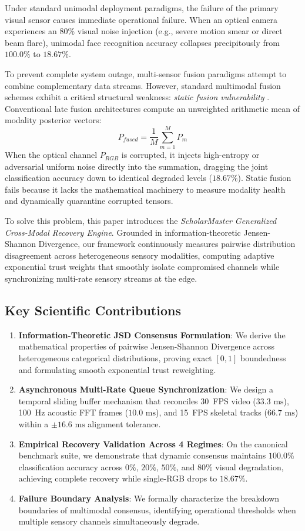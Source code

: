 \documentclass[10pt,journal,compsoc]{IEEEtran}
\begin{document}
Under standard unimodal deployment paradigms, the failure of the primary visual sensor causes immediate operational failure. When an optical camera experiences an $80\%$ visual noise injection (e.g., severe motion smear or direct beam flare), unimodal face recognition accuracy collapses precipitously from $100.0\%$ to $18.67\%$. 

To prevent complete system outage, multi-sensor fusion paradigms attempt to combine complementary data streams. However, standard multimodal fusion schemes exhibit a critical structural weakness: \textit{static fusion vulnerability} \cite{ngiam2011multimodal}. Conventional late fusion architectures compute an unweighted arithmetic mean of modality posterior vectors:
\begin{equation}
P_{fused} = \frac{1}{M} \sum_{m=1}^M P_m
\end{equation}
When the optical channel $P_{RGB}$ is corrupted, it injects high-entropy or adversarial uniform noise directly into the summation, dragging the joint classification accuracy down to identical degraded levels ($18.67\%$). Static fusion fails because it lacks the mathematical machinery to measure modality health and dynamically quarantine corrupted tensors.

To solve this problem, this paper introduces the \textit{ScholarMaster Generalized Cross-Modal Recovery Engine}. Grounded in information-theoretic Jensen-Shannon Divergence, our framework continuously measures pairwise distribution disagreement across heterogeneous sensory modalities, computing adaptive exponential trust weights that smoothly isolate compromised channels while synchronizing multi-rate sensory streams at the edge.

\subsection{Key Scientific Contributions}
\begin{enumerate}
    \item \textbf{Information-Theoretic JSD Consensus Formulation}: We derive the mathematical properties of pairwise Jensen-Shannon Divergence across heterogeneous categorical distributions, proving exact $[0, 1]$ boundedness and formulating smooth exponential trust reweighting.
    \item \textbf{Asynchronous Multi-Rate Queue Synchronization}: We design a temporal sliding buffer mechanism that reconciles 30~FPS video ($33.3\text{ ms}$), 100~Hz acoustic FFT frames ($10.0\text{ ms}$), and 15~FPS skeletal tracks ($66.7\text{ ms}$) within a $\pm 16.6\text{ ms}$ alignment tolerance.
    \item \textbf{Empirical Recovery Validation Across 4 Regimes}: On the canonical benchmark suite, we demonstrate that dynamic consensus maintains $100.0\%$ classification accuracy across $0\%$, $20\%$, $50\%$, and $80\%$ visual degradation, achieving complete recovery while single-RGB drops to $18.67\%$.
    \item \textbf{Failure Boundary Analysis}: We formally characterize the breakdown boundaries of multimodal consensus, identifying operational thresholds when multiple sensory channels simultaneously degrade.
\end{enumerate}
\end{document}
